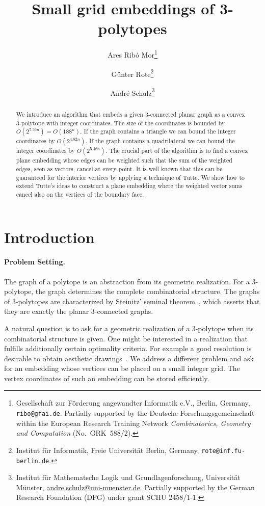 \documentclass{article}
\title{Small grid embeddings of 3-polytopes}
\author{  Ares {Rib\'o Mor}\thanks{Gesellschaft zur F{\"o}rderung angewandter Informatik e.V., Berlin, Germany,  \texttt{ribo@gfai.de}.
Partially supported by the
Deutsche Forschungsgemeinschaft within the European Research Training Network \emph{Combinatorics,
Geometry and Computation} (No.~GRK~588/2).}
	\and
	G\"unter Rote\thanks{Institut f\"ur Informatik, Freie Universit\"at Berlin, Germany, \texttt{rote}\texttt{@inf.fu-berlin.de}.}
	\and
	Andr\'e Schulz\thanks{Institut f\"ur Mathematsche Logik und Grundlagenforschung, Universit\"at M\"unster, \protect\url{andre.schulz@uni-muenster.de}. Partially supported by
the German Research Foundation (DFG) under grant SCHU 2458/1-1.}
}
\theoremstyle{plain} \newtheorem{thm}{Theorem}[section]
\begin{document}
\maketitle


\begin{abstract}
We introduce an algorithm that embeds a given 3-connected planar graph as a convex 3-polytope with integer coordinates. The size of the  coordinates is bounded by $O(2^{7.55n})=O(188^{n})$. If the graph contains a triangle we can bound the integer coordinates by $O(2^{4.82n})$. If the graph contains a quadrilateral we can bound the integer coordinates by $O(2^{5.46n})$. The crucial part of the algorithm is to find a convex plane embedding whose edges can be weighted such that the sum of the weighted edges, seen as vectors, cancel at every point. It is well known that this can be guaranteed for the interior vertices by applying a technique of Tutte. We show how to extend Tutte's ideas to construct a plane embedding where the weighted vector sums cancel also on the vertices of the boundary face. 
\end{abstract}

\section{Introduction}

\paragraph{Problem Setting.}
The graph of a polytope is an abstraction from its geometric realization.
For a 3-polytope,
 the graph determines the complete combinatorial structure.
The graphs of 3-polytopes are characterized by Steinitz' seminal
 theorem~\cite{s-emw-22}, which asserts that they are exactly the planar 3-connected graphs.



A natural question is to ask for a geometric realization of a 3-polytope when its combinatorial structure is given. One might be interested in a realization that fulfills additionally certain optimality criteria. For example a good resolution is desirable to obtain aesthetic drawings~\cite{cgt-cdgtt-96,s-dpgvr-09}. 
We address a different problem and ask for an embedding whose vertices can be placed on a small integer grid. The vertex coordinates of such an embedding can be stored efficiently.
\end{document}
